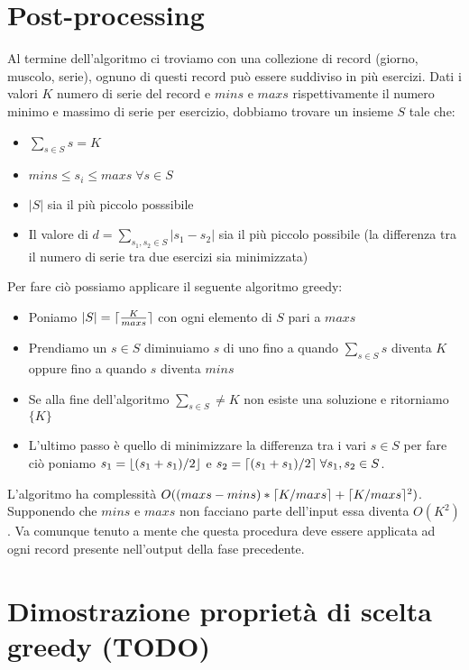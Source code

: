 \documentclass{article}
\DeclarePairedDelimiter\ceil{\lceil}{\rceil}
\DeclarePairedDelimiter\floor{\lfloor}{\rfloor}
\begin{document}
\section{Post-processing}
Al termine dell'algoritmo ci troviamo con una collezione di record (giorno,
muscolo, serie), ognuno di questi record può essere suddiviso in più
esercizi. Dati i valori $K$ numero di serie del record e $mins$ e $maxs$
rispettivamente il numero minimo e massimo di serie per esercizio, dobbiamo
trovare un insieme $S$ tale che:
\begin{itemize}
    \item $\sum_{s \in S} s = K$
    \item $mins \leq s_i \leq maxs \; \forall s \in S$
    \item $|S|$ sia il più piccolo posssibile
    \item Il valore di $d = \sum_{s_1, s_2 \in S} |s_1 - s_2|$ sia il più
          piccolo possibile (la differenza tra il numero di serie tra due
          esercizi sia minimizzata)
\end{itemize}
Per fare ciò possiamo applicare il seguente algoritmo greedy:
\begin{itemize}
    \item Poniamo $|S| = \ceil{\frac{K}{maxs}}$ con ogni elemento di $S$
          pari a $maxs$
    \item Prendiamo un $s \in S$ diminuiamo $s$ di uno fino a quando
          $\sum_{s \in S} s$ diventa $K$ oppure fino a quando $s$ diventa $mins$
    \item Se alla fine dell'algoritmo $\sum_{s \in S} \neq K$ non esiste una
          soluzione e ritorniamo $\{ K \}$
    \item L'ultimo passo è quello di minimizzare la differenza tra i vari
          $s \in S$ per fare ciò poniamo $s_1 = \floor{(s_1 + s_1) / 2}$
          e $s_2 = \ceil{(s_1 + s_1) / 2} \; \forall s_1, s_2 \in S$.
\end{itemize}
L'algoritmo ha complessità
$O((maxs - mins) * \ceil{K / maxs} + \ceil{K / maxs}^2)$.
Supponendo che $mins$ e $maxs$ non facciano parte dell'input essa diventa
$O(K^2)$. Va comunque tenuto a mente che questa procedura deve essere applicata
ad ogni record presente nell'output della fase precedente.

\section{Dimostrazione proprietà di scelta greedy (TODO)}
\end{document}
